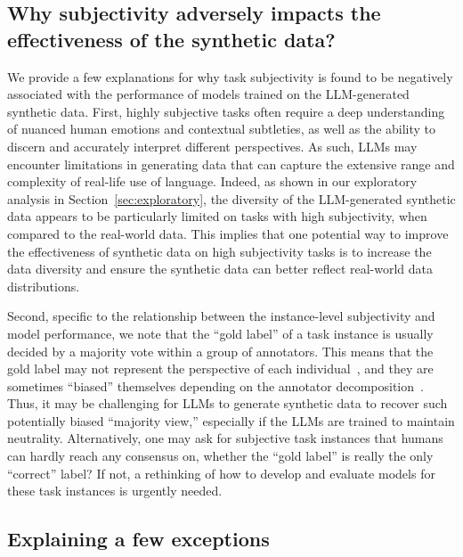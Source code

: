 \subsection{Why subjectivity adversely impacts the effectiveness of the synthetic data?}
We provide a few explanations for why task subjectivity is found to be negatively associated with the performance of models trained on the LLM-generated synthetic data.
First, highly subjective tasks often require a deep understanding of nuanced human emotions and contextual subtleties, as well as the ability to discern and accurately interpret different perspectives. As such, LLMs may encounter limitations in generating data that can capture the extensive range and complexity of real-life use of language. Indeed, as shown in our exploratory analysis in Section~\ref{sec:exploratory}, the diversity of the LLM-generated synthetic data appears to be particularly limited on tasks with high subjectivity, when compared to the real-world data. This implies that one potential way to improve the effectiveness of synthetic data on high subjectivity tasks is to increase the data diversity and ensure the synthetic data can better reflect real-world data distributions. 

Second, specific to the relationship between the instance-level subjectivity and model performance, we note that the ``gold label'' of a task instance is usually decided by a majority vote within a group of annotators. This means that the gold label may not represent the perspective of each individual~\cite{goyal2022your}, and they are sometimes ``biased'' themselves depending on the annotator decomposition~\cite{li2022towards}. Thus, it may be challenging for LLMs to generate synthetic data to recover such potentially biased ``majority view,'' especially if the LLMs are trained to maintain neutrality. Alternatively, one may ask for subjective task instances that humans can hardly reach any consensus on, whether the ``gold label'' is really the only ``correct'' label? If not, a rethinking of how to develop and evaluate models for these task instances is urgently needed.

\subsection{Explaining a few exceptions}

